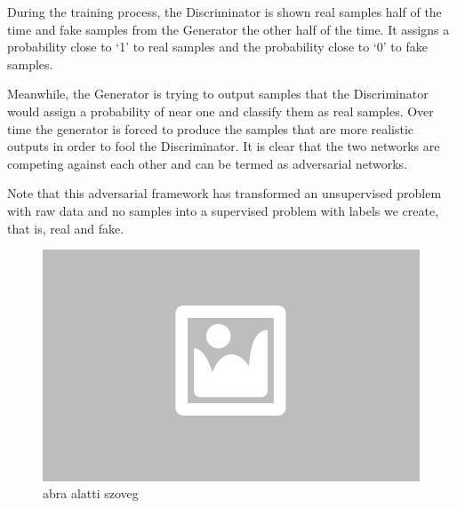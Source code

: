 During the training process, the Discriminator is shown real samples half of the time and fake samples from the Generator the other half of the time. It assigns a probability close to ‘1’ to real samples and the probability close to ‘0’ to fake samples.

Meanwhile, the Generator is trying to output samples that the Discriminator would assign a probability of near one and classify them as real samples. Over time the generator is forced to produce the samples that are more realistic outputs in order to fool the Discriminator. It is clear that the two networks are competing against each other and can be termed as adversarial networks.  


Note that this adversarial framework has transformed an unsupervised problem with raw data and no samples into a supervised problem with labels we create, that is, real and fake. 

\begin{figure}[ht]
	\centering
	\includegraphics[width=0.65\columnwidth]{figures/abra.png}
	\caption{abra alatti szoveg}
\end{figure}

